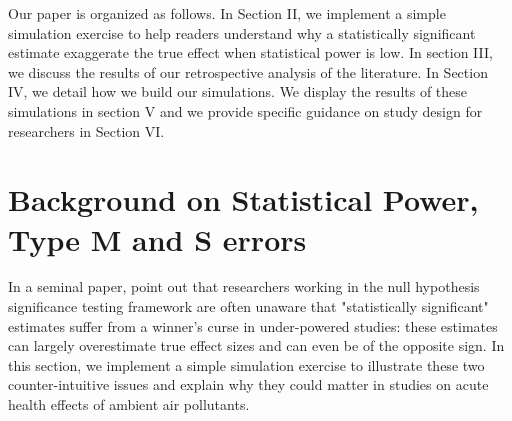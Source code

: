 \documentclass[12pt]{article}
\begin{document}
    Our paper is organized as follows. In Section II, we implement a simple simulation exercise to help readers understand why a statistically significant estimate exaggerate the true effect when statistical power is low. In section III, we discuss the results of our retrospective analysis of the literature. In Section IV, we detail how we build our simulations. We display the results of these simulations in section V and we provide specific guidance on study design for researchers in Section VI.
    




\section{Background on Statistical Power, Type M and S errors}\label{sec:background}

    In a seminal paper, \cite{gelman_beyond_2014} point out that researchers working in the null hypothesis significance testing framework are often unaware that "statistically significant" estimates suffer from a winner's curse in under-powered studies: these estimates can largely overestimate true effect sizes and can even be of the opposite sign. In this section, we implement a simple simulation exercise to illustrate these two counter-intuitive issues and explain why they could matter in studies on acute health effects of ambient air pollutants.
\end{document}
